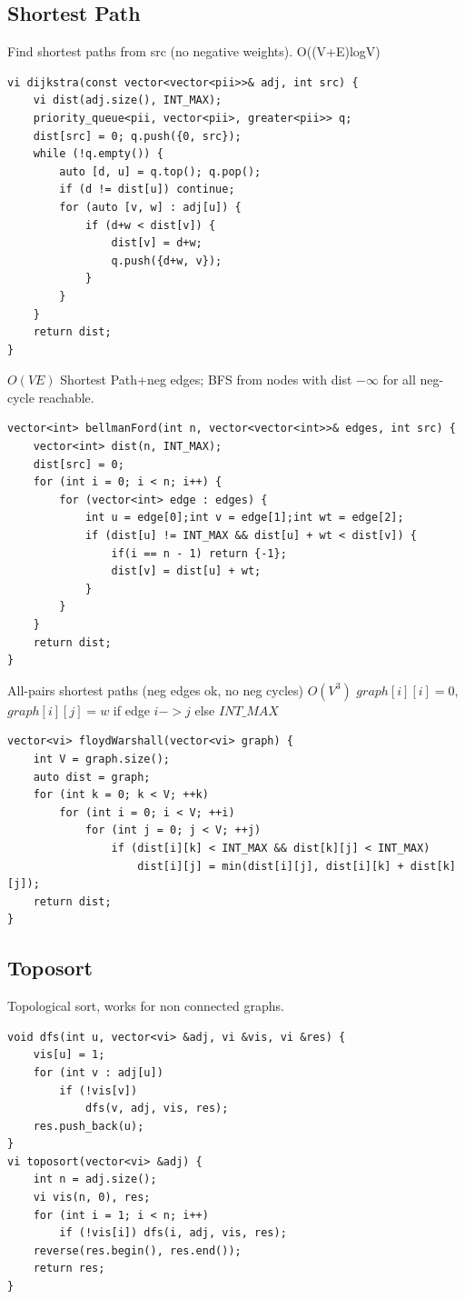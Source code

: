 \documentclass[10pt,a4paper]{article}
\begin{document}
\subsection{Shortest Path}

Find shortest paths from src (no negative weights). O((V+E)logV)
\begin{verbatim}
vi dijkstra(const vector<vector<pii>>& adj, int src) {
    vi dist(adj.size(), INT_MAX);
    priority_queue<pii, vector<pii>, greater<pii>> q;
    dist[src] = 0; q.push({0, src});
    while (!q.empty()) {
        auto [d, u] = q.top(); q.pop();
        if (d != dist[u]) continue;
        for (auto [v, w] : adj[u]) {
            if (d+w < dist[v]) {
                dist[v] = d+w;
                q.push({d+w, v});
            }
        }
    }
    return dist;
}
\end{verbatim}
$O(VE)$ Shortest Path+neg edges; BFS from nodes with dist $-\infty$ for all neg-cycle reachable.
\begin{verbatim}
vector<int> bellmanFord(int n, vector<vector<int>>& edges, int src) {
	vector<int> dist(n, INT_MAX);
	dist[src] = 0;
	for (int i = 0; i < n; i++) {
		for (vector<int> edge : edges) {
			int u = edge[0];int v = edge[1];int wt = edge[2];
			if (dist[u] != INT_MAX && dist[u] + wt < dist[v]) {
                if(i == n - 1) return {-1};
                dist[v] = dist[u] + wt;
            }
		}
	}
    return dist;
}
\end{verbatim}
All-pairs shortest paths (neg edges ok, no neg cycles) $O(V^3)$
$graph[i][i]=0$, $graph[i][j]=w$ if edge $i->j$ else $INT\_MAX$
\begin{verbatim}
vector<vi> floydWarshall(vector<vi> graph) {
    int V = graph.size();
    auto dist = graph;
    for (int k = 0; k < V; ++k)
        for (int i = 0; i < V; ++i)
            for (int j = 0; j < V; ++j)
                if (dist[i][k] < INT_MAX && dist[k][j] < INT_MAX)
                    dist[i][j] = min(dist[i][j], dist[i][k] + dist[k][j]);
    return dist;
}
\end{verbatim}

\subsection{Toposort}

Topological sort, works for non connected graphs.
\begin{verbatim}
void dfs(int u, vector<vi> &adj, vi &vis, vi &res) {
    vis[u] = 1;
    for (int v : adj[u])
        if (!vis[v])
            dfs(v, adj, vis, res);
    res.push_back(u);
}
vi toposort(vector<vi> &adj) {
    int n = adj.size();
    vi vis(n, 0), res;
    for (int i = 1; i < n; i++)
        if (!vis[i]) dfs(i, adj, vis, res);
    reverse(res.begin(), res.end());
    return res;
}
\end{verbatim}
\end{document}
